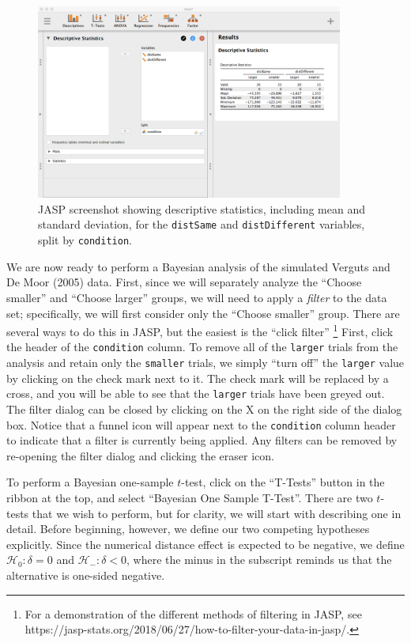 \documentclass[english,,doc,floatsintext]{apa6}
\let\rmarkdownfootnote\footnote%
\def\footnote{\protect\rmarkdownfootnote}
\begin{document}
\begin{figure}
\centering
\includegraphics[width=0.9\textwidth,height=\textheight]{figures/ttestDescriptives.png}
\caption{\label{fig:ttestDescriptives}JASP screenshot showing descriptive statistics, including mean and standard deviation, for the \texttt{distSame} and \texttt{distDifferent} variables, split by \texttt{condition}.}
\end{figure}

We are now ready to perform a Bayesian analysis of the simulated Verguts and De Moor (2005) data. First, since we will separately analyze the \enquote{Choose smaller} and \enquote{Choose larger} groups, we will need to apply a \emph{filter} to the data set; specifically, we will first consider only the \enquote{Choose smaller} group. There are several ways to do this in JASP, but the easiest is the \enquote{click filter}
\footnote{For a demonstration of the different methods of filtering in JASP, see https://jasp-stats.org/2018/06/27/how-to-filter-your-data-in-jasp/.}
First, click the header of the \texttt{condition} column. To remove all of the \texttt{larger} trials from the analysis and retain only the \texttt{smaller} trials, we simply \enquote{turn off} the \texttt{larger} value by clicking on the check mark next to it. The check mark will be replaced by a cross, and you will be able to see that the \texttt{larger} trials have been greyed out. The filter dialog can be closed by clicking on the X on the right side of the dialog box. Notice that a funnel icon will appear next to the \texttt{condition} column header to indicate that a filter is currently being applied. Any filters can be removed by re-opening the filter dialog and clicking the eraser icon.

To perform a Bayesian one-sample \(t\)-test, click on the \enquote{T-Tests} button in the ribbon at the top, and select \enquote{Bayesian One Sample T-Test}. There are two \(t\)-tests that we wish to perform, but for clarity, we will start with describing one in detail. Before beginning, however, we define our two competing hypotheses explicitly. Since the numerical distance effect is expected to be negative, we define \(\mathcal{H}_{0}:\delta = 0\) and \(\mathcal{H}_{-}:\delta < 0\), where the minus in the subscript reminds us that the alternative is one-sided negative.
\end{document}
